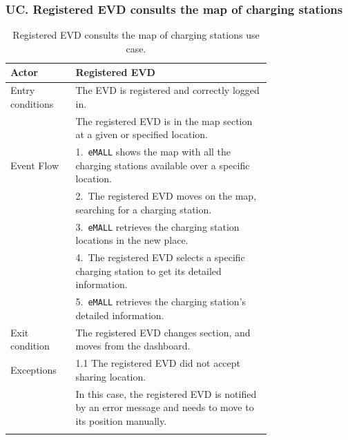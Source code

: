 \subsubsection*{UC\cuc . Registered EVD consults the map of charging stations}
\begin{center}
    \begin{longtable}{lp{0.75\linewidth}}
        \hline
        Actor            & Registered EVD                                                                                               \\
        \hline
        Entry conditions & The EVD is registered and correctly logged in.                                                               \\
        & The registered EVD is in the map section at a given or specified location.                                   \\
        \hline
        Event Flow       & 1.\ \verb|eMALL| shows the map with all the charging stations available over a specific location.            \\
        & 2.\ The registered EVD moves on the map, searching for a charging station.                                   \\
        & 3.\ \verb|eMALL| retrieves the charging station locations in the new place.                                  \\
        & 4.\ The registered EVD selects a specific charging station to get its detailed information.                  \\
        & 5.\ \verb|eMALL| retrieves the charging station's detailed information.                                      \\
        \hline
        Exit condition   & The registered EVD changes section, and moves from the dashboard.                                            \\
        \hline
        Exceptions       & 1.1 The registered EVD did not accept sharing location.                                                      \\
        & In this case, the registered EVD is notified by an error message and needs to move to its position manually. \\
        \hline
        \caption{Registered EVD consults the map of charging stations use case.}
        \label{tab: EVD_map_charging_stations_use_case}
    \end{longtable}


\end{center}
